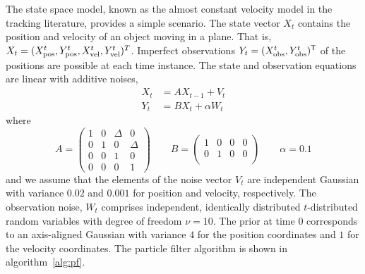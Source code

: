 The state space model, known as the almost constant velocity model in the
tracking literature, provides a simple scenario. The state vector $X_t$
contains the position and velocity of an object moving in a plane. That is,
$X_t = (X_{\mathrm{pos}}^t, Y_{\mathrm{pos}}^t, X_{\mathrm{vel}}^t, Y_{\mathrm{vel}}^t)^T$. Imperfect observations $Y_t =
(X_{\mathrm{obs}}^t, Y_{\mathrm{obs}}^t)^{\mathsf{T}}$ of the positions are possible at each time
instance. The state and observation equations are linear with additive noises,
\begin{align*}
  X_t &= AX_{t-1} + V_t \\
  Y_t &= BX_t + \alpha W_t
\end{align*}
where
\begin{equation*}
  A = \begin{pmatrix}
    1 & 0 & \Delta & 0      \\
    0 & 1 & 0      & \Delta \\
    0 & 0 & 1      & 0      \\
    0 & 0 & 0      & 1
  \end{pmatrix} \qquad
  B = \begin{pmatrix}
    1 & 0 & 0 & 0 \\
    0 & 1 & 0 & 0 \\
  \end{pmatrix} \qquad
  \alpha = 0.1
\end{equation*}
and we assume that the elements of the noise vector $V_t$ are independent
Gaussian with variance $0.02$ and $0.001$ for position and velocity,
respectively. The observation noise, $W_t$ comprises independent, identically
distributed $t$-distributed random variables with degree of freedom $\nu = 10$.
The prior at time $0$ corresponds to an axis-aligned Gaussian with variance $4$
for the position coordinates and $1$ for the velocity coordinates. The particle
filter algorithm is shown in algorithm~\ref{alg:pf}.

